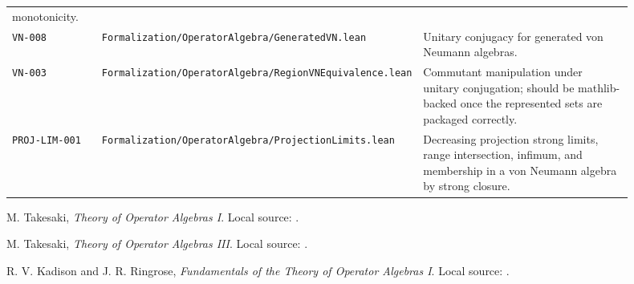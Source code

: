 \documentclass{article}
\begin{document}
\begin{longtable}{@{}p{0.15\linewidth}p{0.35\linewidth}p{0.40\linewidth}@{}}
monotonicity. \\
\texttt{VN-008} &
\texttt{Formalization/OperatorAlgebra/GeneratedVN.lean} &
Unitary conjugacy for generated von Neumann algebras. \\
\texttt{VN-003} &
\texttt{Formalization/OperatorAlgebra/RegionVNEquivalence.lean} &
Commutant manipulation under unitary conjugation; should be mathlib-backed
once the represented sets are packaged correctly. \\
\texttt{PROJ-LIM-001} &
\texttt{Formalization/OperatorAlgebra/ProjectionLimits.lean} &
Decreasing projection strong limits, range intersection, infimum, and
membership in a von Neumann algebra by strong closure. \\
\bottomrule
\end{longtable}

\begin{thebibliography}{9}
M. Takesaki, \emph{Theory of Operator Algebras I}.  Local source:
.

M. Takesaki, \emph{Theory of Operator Algebras III}.  Local source:
.

R. V. Kadison and J. R. Ringrose, \emph{Fundamentals of the Theory of
Operator Algebras I}.  Local source: .
\end{thebibliography}
\end{document}
